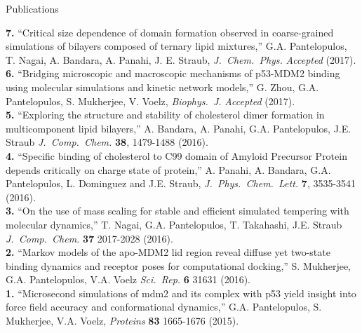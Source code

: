 \documentclass[a4paper]{article}
\def\jcc{\it J.~Comp.~Chem.}
\def\jpcl{\it J.~Phys.~Chem.~Lett.}
\def\prot{\it Proteins}
\def\jcp{\it J.~Chem.~Phys.}
\def\bj{\it Biophys.~J.}
\def\jpcl{\it J.~Phys.~Chem.~Lett.}
\def\scirep{\it Sci.~Rep.}
\begin{document}
\begin{rubrique}{Publications}
\end{rubrique}

{\bf 7.} ``Critical size dependence of domain formation observed in coarse-grained simulations of bilayers composed of ternary lipid mixtures,'' G.A. Pantelopulos, T. Nagai, A. Bandara, A. Panahi, J. E. Straub, {\jcp}  \textit{Accepted} (2017). \\
{\bf 6.} ``Bridging microscopic and macroscopic mechanisms of p53-MDM2 binding using molecular simulations and kinetic network models,'' G. Zhou, G.A. Pantelopulos, S. Mukherjee, V. Voelz, {\bj} \textit{Accepted} (2017). \\
{\bf 5.} ``Exploring the structure and stability of cholesterol dimer formation in multicomponent lipid bilayers,'' A. Bandara, A. Panahi, G.A. Pantelopulos, J.E. Straub {\jcc} {\bf 38}, 1479-1488 (2016). \\
{\bf 4.}  ``Specific binding of cholesterol to C99 domain of Amyloid Precursor Protein depends critically on charge state of protein,'' A. Panahi, A. Bandara, G.A. Pantelopulos, L. Dominguez and J.E. Straub, {\jpcl} {\bf 7}, 3535-3541 (2016). \\
{\bf 3.} ``On the use of mass scaling for stable and efficient simulated tempering with molecular dynamics,'' T. Nagai, G.A. Pantelopulos, T. Takahashi, J.E. Straub {\jcc} {\bf 37} 2017-2028 (2016). \\
{\bf 2.} ``Markov models of the apo-MDM2 lid region reveal diffuse yet two-state binding dynamics and receptor poses for computational docking,'' S. Mukherjee, G.A. Pantelopulos, V.A. Voelz {\scirep} {\bf 6} 31631 (2016). \\
{\bf 1.} ``Microsecond simulations of mdm2 and its complex with p53 yield insight into force field accuracy and conformational dynamics,'' G.A. Pantelopulos, S. Mukherjee, V.A. Voelz, {\prot} {\bf 83} 1665-1676 (2015).
\end{document}
